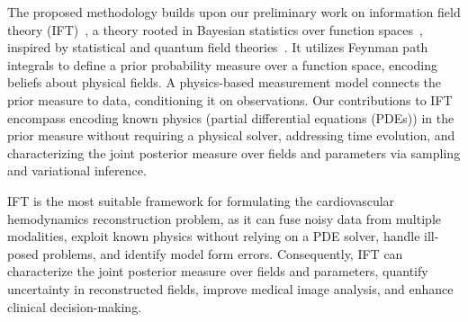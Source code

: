 The proposed methodology builds upon our preliminary work on information field theory (IFT)~\cite{alberts2023physics, hao2023information}, a theory rooted in Bayesian statistics over function spaces~\cite{ensslin2009information}, inspired by statistical and quantum field theories~\cite{parisi1988statistical, lancaster2014quantum}. 
It utilizes Feynman path integrals to define a prior probability measure over a function space, encoding beliefs about physical fields.
A physics-based measurement model connects the prior measure to data, conditioning it on observations.
Our contributions to IFT encompass encoding known physics (partial differential equations (PDEs)) in the prior measure without requiring a physical solver, addressing time evolution, and characterizing the joint posterior measure over fields and parameters via sampling and variational inference.

IFT is the most suitable framework for formulating the cardiovascular hemodynamics reconstruction problem, as it can fuse noisy data from multiple modalities, exploit known physics without relying on a PDE solver, handle ill-posed problems, and identify model form errors.
Consequently, IFT can characterize the joint posterior measure over fields and parameters, quantify uncertainty in reconstructed fields, improve medical image analysis, and enhance clinical decision-making.

